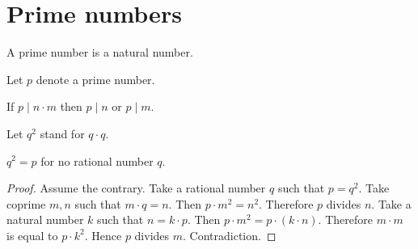 \documentclass{article}
\begin{document}
  \section*{Prime numbers}

  \begin{forthel}
    \begin{signature}
      A prime number is a natural number.
    \end{signature}

    Let $p$ denote a prime number.

    \begin{axiom}
      If $p \mid n \cdot m$ then $p \mid n$ or $p \mid m$.
    \end{axiom}

    Let $q^{2}$ stand for $q \cdot q$.

    \begin{proposition}
      $q^{2} = p$ for no rational number $q$.
    \end{proposition}
    \begin{proof}
      Assume the contrary.
      Take a rational number $q$ such that $p = q^{2}$.
      Take coprime $m,n$ such that $m \cdot q = n$.
      Then $p \cdot m^{2} = n^{2}$.
      Therefore $p$ divides $n$.
      Take a natural number $k$ such that $n = k \cdot p$.
      Then $p \cdot m^{2} = p \cdot (k \cdot n)$.
      Therefore $m \cdot m$ is equal to $p \cdot k^{2}$.
      Hence $p$ divides $m$.
      Contradiction.
    \end{proof}
  \end{forthel}
\end{document}
